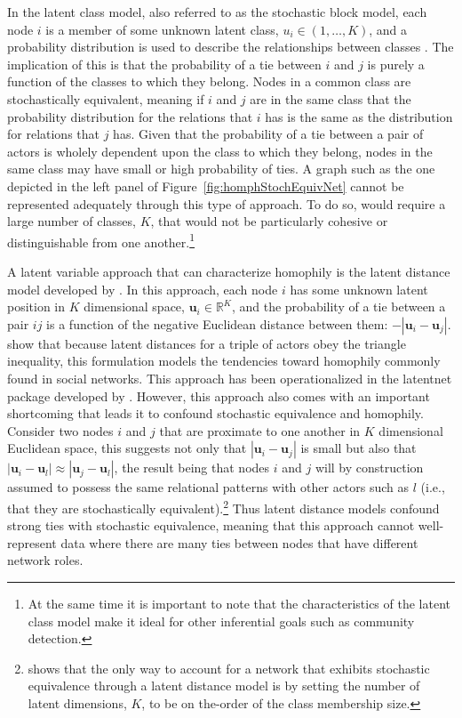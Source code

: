 \documentclass[12pt,onesided,pdflatex]{amsart}
\newcommand{\pkg}[1]{{\fontseries{b}\selectfont #1}}
\begin{document}
In the latent class model, also referred to as the stochastic block model, each node $i$ is a member of some unknown latent class, $u_{i} \in (1,\ldots,K)$, and a probability distribution is used to describe the relationships between classes  \citep{nowicki:snijders:2001}. The implication of this is that the probability of a tie between $i$ and $j$ is purely a function of the classes to which they belong. Nodes in a common class are stochastically equivalent, meaning if $i$ and $j$ are in the same class that the probability distribution for the relations that $i$ has is the same as the distribution for relations that $j$ has. Given that the probability of a tie between a pair of actors is wholely dependent upon the class to which they belong, nodes in the same class may have small or high probability of ties. A graph such as the one depicted in the left panel of Figure~\ref{fig:homphStochEquivNet} cannot be represented adequately through this type of approach. To do so, would require a large number of classes, $K$, that would not be particularly cohesive or distinguishable from one another.\footnote{At the same time it is important to note that the characteristics of the latent class model make it ideal for other inferential goals such as community detection.}

A latent variable approach that can characterize homophily is the latent distance model developed by \citet{hoff:etal:2002}. In this approach, each node $i$ has some unknown latent position in $K$ dimensional space, $\textbf{u}_{i} \in \mathbb{R}^{K}$, and the probability of a tie between a pair $ij$ is a function of the negative Euclidean distance between them: $-|\textbf{u}_{i} - \textbf{u}_{j}|$. \citet{hoff:etal:2002} show that because latent distances for a triple of actors obey the triangle inequality, this formulation models the tendencies toward homophily commonly found in social networks. This approach has been operationalized in the \pkg{latentnet} package developed by \citet{krivitsky:handcock:2015}. However, this approach also comes with an important shortcoming that leads it to confound stochastic equivalence and homophily. Consider two nodes $i$ and $j$ that are proximate to one another in $K$ dimensional Euclidean space, this suggests not only that $|\textbf{u}_{i} - \textbf{u}_{j}|$ is small but also that $|\textbf{u}_{i} - \textbf{u}_{l}| \approx |\textbf{u}_{j} - \textbf{u}_{l}|$, the result being that nodes $i$ and $j$ will by construction assumed to possess the same relational patterns with other actors such as $l$ (i.e., that they are stochastically equivalent).\footnote{\citet{hoff:2008} shows that the only way to account for a network that exhibits stochastic equivalence through a latent distance model is by setting the number of latent dimensions, $K$, to be on the-order of the class membership size.} Thus latent distance models confound strong ties with stochastic equivalence, meaning that this approach cannot well-represent data where there are many ties between nodes that have different network roles. 
\end{document}
